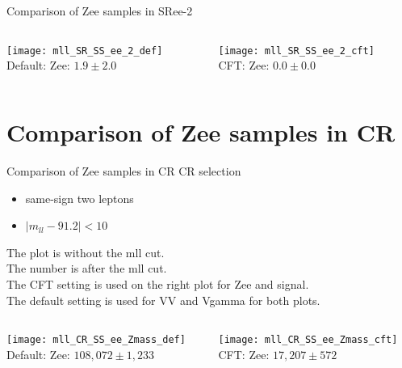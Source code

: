 \documentclass[mathserif,serif]{beamer}
\begin{document}
\begin{frame}{Comparison of Zee samples in SRee-2}
\begin{columns}

\begin{column}{0.5\textwidth}
\begin{center}
\texttt{[image: mll\_SR\_SS\_ee\_2\_def]} \\
Default: Zee: $1.9\pm2.0$
\end{center}
\end{column}

\begin{column}{0.5\textwidth}
\begin{center}
\texttt{[image: mll\_SR\_SS\_ee\_2\_cft]} \\
CFT: Zee: $0.0\pm0.0$
\end{center}
\end{column}

\end{columns}

\end{frame}

\section{Comparison of Zee samples in CR}
\begin{frame}
\sectionpage
\end{frame}

\begin{frame}{Comparison of Zee samples in CR}
CR selection
\begin{itemize}
\item same-sign two leptons
\item $|m_{ll} - 91.2| < 10$
\end{itemize}
The plot is without the mll cut. \\
The number is after the mll cut. \\
The CFT setting is used on the right plot for Zee and signal. \\
The default setting is used for VV and Vgamma for both plots. \\

\begin{columns}

\begin{column}{0.5\textwidth}
\begin{center}
\texttt{[image: mll\_CR\_SS\_ee\_Zmass\_def]} \\
Default: Zee: $108,072\pm1,233$
\end{center}
\end{column}

\begin{column}{0.5\textwidth}
\begin{center}
\texttt{[image: mll\_CR\_SS\_ee\_Zmass\_cft]} \\
CFT: Zee: $17,207\pm572$
\end{center}
\end{column}

\end{columns}

\end{frame}
\end{document}
